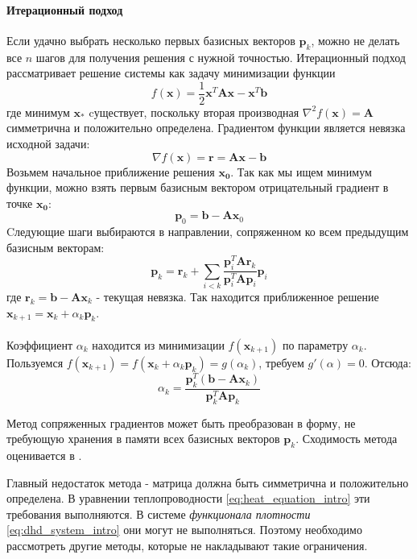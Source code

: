\paragraph{Итерационный подход}
Если удачно выбрать несколько первых базисных векторов $\mathbf{p}_k$, можно не делать все $n$ шагов
для получения решения с нужной точностью. Итерационный подход рассматривает решение системы как задачу
минимизации функции
\begin{equation}
f(\mathbf{x}) = \frac{1}{2} \mathbf{x}^T \mathbf{A} \mathbf{x} - \mathbf{x}^T \mathbf{b}
\end{equation}
где минимум $\mathbf{x_*}$ cуществует, поскольку вторая производная $\nabla ^2 f(\mathbf{x}) = \mathbf{A}$ симметрична и положительно определена. Градиентом функции является невязка исходной задачи:
\begin{equation}
\nabla f(\mathbf{x}) = \mathbf{r} = \mathbf{Ax} - \mathbf{b}
\end{equation}
Возьмем начальное приближение решения $\mathbf{x_0}$. Так как мы ищем минимум функции, можно взять первым базисным вектором отрицательный градиент в точке $\mathbf{x_0}$:
\begin{equation}
\mathbf{p}_0 = \mathbf{b} - \mathbf{Ax}_0
\end{equation}
Cледующие шаги выбираются в направлении, сопряженном ко всем предыдущим базисным векторам:
\begin{equation}
\mathbf{p}_k = \mathbf{r}_k + \sum_{i < k} \frac {\mathbf{p}^T_i \mathbf{A r}_k}
{\mathbf{p}^T_i \mathbf{A p}_i} \mathbf{p}_i
\end{equation}
где $\mathbf{r}_k = \mathbf{b} - \mathbf{Ax}_k$ - текущая невязка. Так находится приближенное решение
$\mathbf{x}_{k+1} = \mathbf{x}_k + \alpha_k \mathbf{p}_k$.
\\ \\
Коэффициент $\alpha_k$ находится из минимизации $f(\mathbf{x}_{k+1})$ по параметру $\alpha_k$. Пользуемся $f(\mathbf{x}_{k+1}) = f(\mathbf{x}_k + \alpha_k \mathbf{p}_k) = g(\alpha_k)$, требуем $g'(\alpha) = 0$. Отсюда:
\begin{equation}
\alpha_k = \frac {\mathbf{p}^T_k (\mathbf{b} - \mathbf{A x}_k)} {\mathbf{p}^T_k \mathbf{A} \mathbf{p}_k}
\end{equation}
\par
Метод сопряженных градиентов может быть преобразован в форму, не требующую хранения в памяти всех базисных векторов $\mathbf{p}_k$. Сходимость метода оценивается в \cite{Golub}.
\par
Главный недостаток метода - матрица должна быть симметрична и положительно определена. В уравнении теплопроводности \eqref{eq:heat_equation_intro} эти требования выполняются. В системе \textit{функционала плотности} \eqref{eq:dhd_system_intro} они могут не выполняться. Поэтому необходимо рассмотреть другие методы, которые не накладывают такие ограничения.

